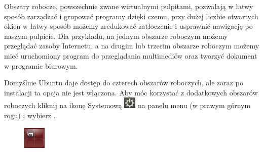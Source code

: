 Obszary robocze, powszechnie zwane wirtualnymi pulpitami, pozwalają w łatwy sposób zarządzać i grupować programy dzięki czemu, przy dużej liczbie otwartych okien w łatwy sposób możemy zredukować zatłoczenie i usprawnić nawigację po naszym pulpicie. Dla przykładu, na jednym obszarze roboczym możemy przeglądać zasoby Internetu, a na drugim lub trzecim obszarze roboczym możemy mieć uruchomiony program do przeglądania multimediów oraz tworzyć dokument w programie biurowym.

Domyślnie Ubuntu daje dostęp do czterech obszarów roboczych, ale zaraz po instalacji ta opcja nie jest włączona. Aby móc korzystać z dodatkowych obszarów roboczych kliknij na ikonę Systemową \includegraphics{images/ikony_zasilanie.png} na panelu menu (w prawym górnym rogu) i wybierz .

\begin{figure}
                \includegraphics[width=\linewidth]{images/ikony_obszary_robocze.png}
\end{figure}

